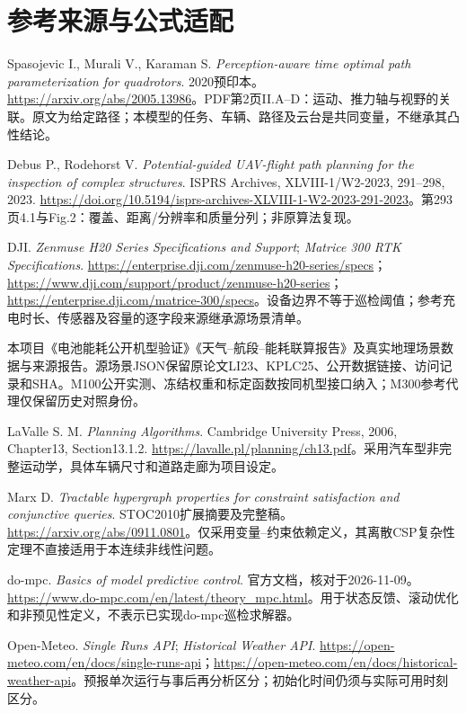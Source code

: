 \section{参考来源与公式适配}
\noindent [R1] Spasojevic I., Murali V., Karaman S. \emph{Perception-aware time optimal path parameterization for quadrotors}. 2020预印本。\url{https://arxiv.org/abs/2005.13986}。PDF第2页II.A--D：运动、推力轴与视野的关联。原文为给定路径；本模型的任务、车辆、路径及云台是共同变量，不继承其凸性结论。

\noindent [R2] Debus P., Rodehorst V. \emph{Potential-guided UAV-flight path planning for the inspection of complex structures}. ISPRS Archives, XLVIII-1/W2-2023, 291--298, 2023. \url{https://doi.org/10.5194/isprs-archives-XLVIII-1-W2-2023-291-2023}。第293页4.1与Fig.2：覆盖、距离/分辨率和质量分列；非原算法复现。

\noindent [R3] DJI. \emph{Zenmuse H20 Series Specifications and Support}; \emph{Matrice 300 RTK Specifications}. \url{https://enterprise.dji.com/zenmuse-h20-series/specs}；\url{https://www.dji.com/support/product/zenmuse-h20-series}；\url{https://enterprise.dji.com/matrice-300/specs}。设备边界不等于巡检阈值；参考充电时长、传感器及容量的逐字段来源继承源场景清单。

\noindent [R4] 本项目《电池能耗公开机型验证》《天气--航段--能耗联算报告》及真实地理场景数据与来源报告。源场景JSON保留原论文LI23、KPLC25、公开数据链接、访问记录和SHA。M100公开实测、冻结权重和标定函数按同机型接口纳入；M300参考代理仅保留历史对照身份。

\noindent [R5] LaValle S. M. \emph{Planning Algorithms}. Cambridge University Press, 2006, Chapter13, Section13.1.2. \url{https://lavalle.pl/planning/ch13.pdf}。采用汽车型非完整运动学，具体车辆尺寸和道路走廊为项目设定。

\noindent [R6] Marx D. \emph{Tractable hypergraph properties for constraint satisfaction and conjunctive queries}. STOC2010扩展摘要及完整稿。\url{https://arxiv.org/abs/0911.0801}。仅采用变量--约束依赖定义，其离散CSP复杂性定理不直接适用于本连续非线性问题。

\noindent [R7] do-mpc. \emph{Basics of model predictive control}. 官方文档，核对于2026-11-09。\url{https://www.do-mpc.com/en/latest/theory_mpc.html}。用于状态反馈、滚动优化和非预见性定义，不表示已实现do-mpc巡检求解器。

\noindent [R8] Open-Meteo. \emph{Single Runs API}; \emph{Historical Weather API}. \url{https://open-meteo.com/en/docs/single-runs-api}；\url{https://open-meteo.com/en/docs/historical-weather-api}。预报单次运行与事后再分析区分；初始化时间仍须与实际可用时刻区分。

